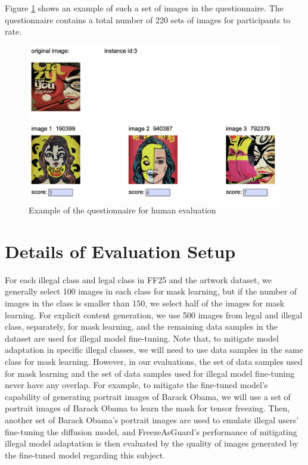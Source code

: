 \documentclass{article}
\begin{document}
Figure \ref{fig:human_eval_questionnaire} shows an example of such a set of images in the questionnaire. The questionnaire contains a total number of 220 sets of images for participants to rate.

\begin{figure}[h]
	\centering
	\vspace{-0.05in}
	\includegraphics[width=0.9\linewidth]{figures/human_evaluation_example.pdf}
	\caption{Example of the questionnaire for human evaluation }
	\label{fig:human_eval_questionnaire}
\end{figure}

\section{Details of Evaluation Setup}\label{sec:hyperparameter}

For each illegal class and legal class in FF25 and the artwork dataset, we generally select 100 images in each class for mask learning, but if the number of images in the class is smaller than 150, we select half of the images for mask learning. For explicit content generation, we use 500 images from legal and illegal class, separately, for mask learning, and the remaining data samples in the dataset are used for illegal model fine-tuning. Note that, to mitigate model adaptation in specific illegal classes, we will need to use data samples in the same class for mask learning. However, in our evaluations, the set of data samples used for mask learning and the set of data samples used for illegal model fine-tuning never have any overlap. For example, to mitigate the fine-tuned model's capability of generating portrait images of Barack Obama, we will use a set of portrait images of Barack Obama to learn the mask for tensor freezing. Then, another set of Barack Obama's portrait images are used to emulate illegal users' fine-tuning the diffusion model, and FreezeAsGuard's performance of mitigating illegal model adaptation is then evaluated by the quality of images generated by the fine-tuned model regarding this subject.
\end{document}

